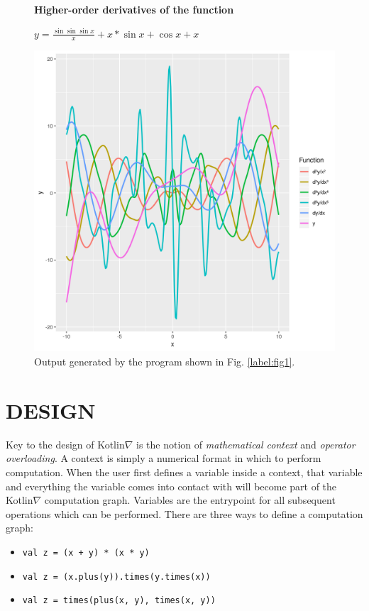 \begin{figure}[!htb]
\textbf{Higher-order derivatives of the function}
\par\medskip
$y = \frac{\sin{\sin{\sin{x}}}}{x} + x * \sin{x} + \cos{x} + x$
\par\medskip
\includegraphics[scale=0.48]{plot.png}
\caption{Output generated by the program shown in Fig. \ref{label:fig1}.}
\end{figure}

\section{DESIGN}

Key to the design of Kotlin$\nabla$ is the notion of \textit{mathematical context} and \textit{operator overloading}. A context is simply a numerical format in which to perform computation. When the user first defines a variable inside a context, that variable and everything the variable comes into contact with will become part of the Kotlin$\nabla$ computation graph. Variables are the entrypoint for all subsequent operations which can be performed. There are three ways to define a computation graph:

\begin{itemize}
    \item \texttt{val z = (x + y) * (x * y)}
    \item \texttt{val z = (x.plus(y)).times(y.times(x))}
    \item \texttt{val z = times(plus(x, y), times(x, y))}
\end{itemize}

